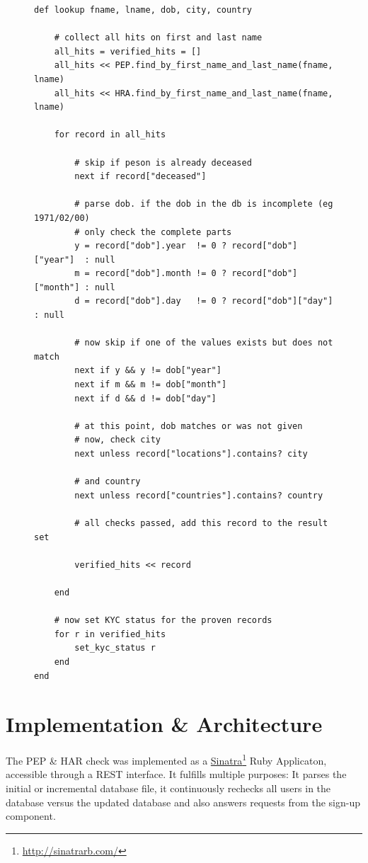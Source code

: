 \documentclass[a4paper, oneside]{csthesis}
\newcommand\fnurl[2]{%
  \href{#2}{#1}\footnote{\url{#2}}%
}
\begin{document}
\begin{figure}
\begin{lstlisting}[caption={The Lookup algorithm},label={lst:world-check-lookup}]
def lookup fname, lname, dob, city, country

    # collect all hits on first and last name
    all_hits = verified_hits = []
    all_hits << PEP.find_by_first_name_and_last_name(fname, lname)
    all_hits << HRA.find_by_first_name_and_last_name(fname, lname)

    for record in all_hits

        # skip if peson is already deceased
        next if record["deceased"]

        # parse dob. if the dob in the db is incomplete (eg 1971/02/00)
        # only check the complete parts
        y = record["dob"].year  != 0 ? record["dob"]["year"]  : null
        m = record["dob"].month != 0 ? record["dob"]["month"] : null
        d = record["dob"].day   != 0 ? record["dob"]["day"]   : null

        # now skip if one of the values exists but does not match
        next if y && y != dob["year"]
        next if m && m != dob["month"]
        next if d && d != dob["day"]

        # at this point, dob matches or was not given
        # now, check city
        next unless record["locations"].contains? city

        # and country
        next unless record["countries"].contains? country

        # all checks passed, add this record to the result set

        verified_hits << record

    end

    # now set KYC status for the proven records
    for r in verified_hits
        set_kyc_status r
    end
end
\end{lstlisting}
\end{figure}

\section{Implementation \& Architecture}

The PEP \& HAR check was implemented as a \fnurl{Sinatra}{http://sinatrarb.com/} Ruby Applicaton, accessible through a REST interface. It fulfills multiple purposes: It parses the initial or incremental database file, it continuously rechecks all users in the database versus the updated database and also answers requests from the sign-up component.
\end{document}
